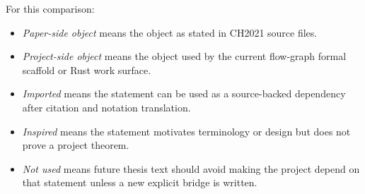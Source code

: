\begin{unverified}
\begin{definition}\label{def:flow-graph-comparison-categories}
For this comparison:
\begin{itemize}
  \item \emph{Paper-side object} means the object as stated in CH2021 source
    files.
  \item \emph{Project-side object} means the object used by the current
    flow-graph formal scaffold or Rust work surface.
  \item \emph{Imported} means the statement can be used as a source-backed
    dependency after citation and notation translation.
  \item \emph{Inspired} means the statement motivates terminology or design but
    does not prove a project theorem.
  \item \emph{Not used} means future thesis text should avoid making the
    project depend on that statement unless a new explicit bridge is written.
\end{itemize}
\end{definition}
\end{unverified}

